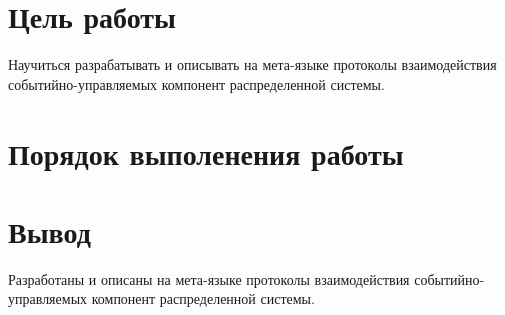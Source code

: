\section{Цель работы}
	Научиться разрабатывать и описывать на мета-языке протоколы взаимодействия событийно-управляемых компонент распределенной системы.
		
\section{Порядок выполенения работы}

	
	
	
	

\section{Вывод}
	Разработаны и описаны на мета-языке протоколы взаимодействия событийно-управляемых компонент распределенной системы.
